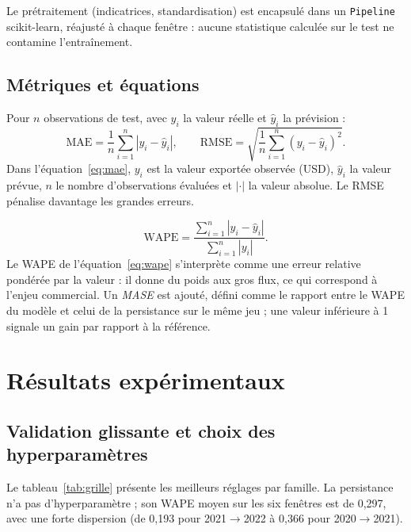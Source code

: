 \documentclass[11pt,a4paper]{article}
\begin{document}
Le prétraitement (indicatrices, standardisation) est encapsulé dans un
\texttt{Pipeline} scikit-learn, réajusté à chaque fenêtre : aucune statistique
calculée sur le test ne contamine l'entraînement.

\subsection{Métriques et équations}

Pour $n$ observations de test, avec $y_i$ la valeur réelle et $\hat y_i$ la
prévision :
\begin{equation}\label{eq:mae}
\mathrm{MAE}=\frac{1}{n}\sum_{i=1}^{n}\left|y_i-\hat y_i\right|,
\qquad
\mathrm{RMSE}=\sqrt{\frac{1}{n}\sum_{i=1}^{n}\left(y_i-\hat y_i\right)^2}.
\end{equation}
Dans l'équation~\eqref{eq:mae}, $y_i$ est la valeur exportée observée (USD),
$\hat y_i$ la valeur prévue, $n$ le nombre d'observations évaluées et
$|\cdot|$ la valeur absolue. Le RMSE pénalise davantage les grandes erreurs.

\begin{equation}\label{eq:wape}
\mathrm{WAPE}=\frac{\sum_{i=1}^{n}\left|y_i-\hat y_i\right|}
{\sum_{i=1}^{n}\left|y_i\right|}.
\end{equation}
Le WAPE de l'équation~\eqref{eq:wape} s'interprète comme une erreur relative
pondérée par la valeur : il donne du poids aux gros flux, ce qui correspond à
l'enjeu commercial. Un \emph{MASE} est ajouté, défini comme le rapport entre le
WAPE du modèle et celui de la persistance sur le même jeu ; une valeur
inférieure à 1 signale un gain par rapport à la référence.

\section{Résultats expérimentaux}\label{sec:resultats}

\subsection{Validation glissante et choix des hyperparamètres}

Le tableau~\ref{tab:grille} présente les meilleurs réglages par famille. La
persistance n'a pas d'hyperparamètre ; son WAPE moyen sur les six fenêtres est
de 0,297, avec une forte dispersion (de 0,193 pour 2021$\to$2022 à 0,366 pour
2020$\to$2021).
\end{document}
